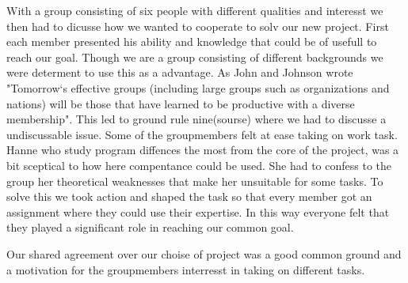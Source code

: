 With a group consisting of six people with different qualities and interesst we then had to dicusse how we wanted to cooperate to solv our new project. First each member presented his ability and knowledge that could be of usefull to reach our goal. Though we are a group consisting of different backgrounds we were determent to use this as a advantage. As John and Johnson wrote  "Tomorrow`s effective groups (including large groups such as organizations and nations) will be those that have learned to be productive with a diverse membership". This led to ground rule nine(sourse) where we had to discusse a undiscussable issue. Some of the groupmembers felt at ease taking on work task.  Hanne who study program diffences the most from the core of the project, was a bit sceptical to how here compentance could be used. She had to confess to the group her theoretical weaknesses that make her unsuitable for some tasks. To solve this we took action and shaped the task so that every member got an assignment where they could use their expertise. In this way everyone felt that they played a significant role in reaching our common goal. 


Our shared agreement over our choise of project was a good common ground and a motivation for the groupmembers interresst in taking on different tasks.


 

  